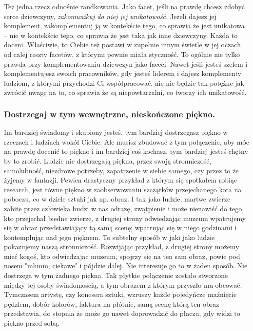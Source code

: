 \documentclass[../dotknieci-miloscia.tex]{subfiles}
\begin{document}
Też jedna rzecz odnośnie randkowania. 
Jako facet, jeśli na prawdę chcesz zdobyć serce dziewczyny, 
\emph{zakomunikuj do niej jej unikatowość.}
Jeżeli dajesz jej komplement, 
zakomplementuj ją w kontekście tego, co sprawia że jest unikatowa 
-- nie w kontekście tego, co sprawia że jest taka jak inne dziewczyny. 
Każda to doceni. 
Właściwie, to Ciebie też postawi w zupełnie innym świetle w jej oczach 
od całej reszty facetów, z którymi pewnie miała styczność. 
To ogólnie nie tylko prawda przy komplementowaniu dziewczyn jako faceci. 
Nawet jeśli jesteś szefem i komplementujesz swoich pracowników, 
gdy jesteś liderem i dajesz komplementy ludziom, z którymi przychodzi Ci współpracować, 
nic nie będzie tak potężne jak zwrócić uwagę na to, 
co sprawia że są niepowtarzalni, co tworzy ich unikatowość. 

\subsubsection{Dostrzegaj w tym wewnętrzne, nieskończone piękno.}
Im bardziej świadomy i skupiony jesteś, 
tym bardziej dostrzegasz piękno w rzeczach i ludziach wokół Ciebie. 
Ale musisz zbudować z tym połączenie, 
aby móc na prawdę docenić to piękno i im bardziej coś kochasz, 
tym bardziej jesteś chętny by to zrobić. 
Ludzie nie dostrzegają piękna, 
przez swoją stronniczość, samolubność, niezdrowe potrzeby, zapatrzenie w siebie samego, 
czy przez to że żyjemy w fantazji. 
Pewien drastyczny przykład z którym się spotkałem robiąc research, 
jest równe piękno w zaobserwowaniu szczątków przejechanego kota na poboczu, 
co w dziele sztuki jak np. obraz. 
I tak jako ludzie, martwe zwierze zabite przez człowieka 
budzi w nas odrazę, zwątpienie i może nienawiść do tego, kto przejechał biedne zwierzę, 
z drugiej strony odwiedzając muzeum wpatrujemy się w obraz przedstawiający tą samą scenę;
wpatrując się w niego godzinami i kontemplując nad jego pięknem. 
To subtelny sposób w jaki jako ludzie pokazujemy naszą stronniczość. 
Rozwijając przykład, z drugiej strony możemy mieć kogoś, kto odwiedzając muzeum, 
spojrzy się na ten sam obraz, powie pod nosem "mhmm, ciekawe" i pójdzie dalej. 
Nie interesuje go to w żaden sposób. 
Nie dostrzega w tym żadnego piękna. 
Tak płytkie połączenie zostało stworzone między tej osoby świadomością, 
a tym obrazem z którym przyszło mu obcować. 
Tymczasem artystę, czy konesera sztuki, 
wzruszy każde pojedyńcze maźnięcie pędzlem, dobór kolorów, faktura na płótnie, 
samą scenę którą ten obraz przedstawia, do stopnia 
że może go nawet doprowadzić do płaczu, gdy widzi to piękno przed sobą. 
\end{document}
